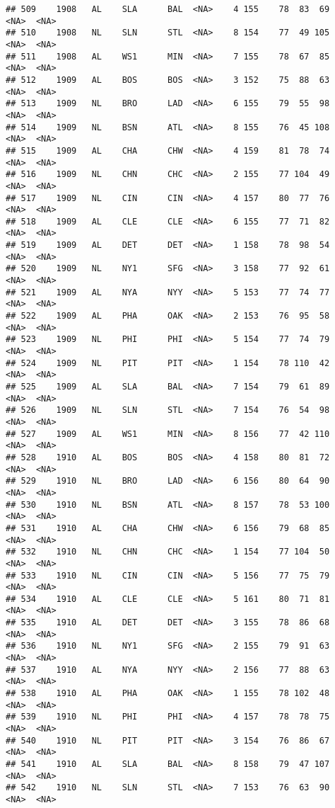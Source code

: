 \documentclass[]{article}
\begin{document}
\begin{verbatim}
## 509    1908   AL    SLA      BAL  <NA>    4 155    78  83  69   <NA>  <NA>
## 510    1908   NL    SLN      STL  <NA>    8 154    77  49 105   <NA>  <NA>
## 511    1908   AL    WS1      MIN  <NA>    7 155    78  67  85   <NA>  <NA>
## 512    1909   AL    BOS      BOS  <NA>    3 152    75  88  63   <NA>  <NA>
## 513    1909   NL    BRO      LAD  <NA>    6 155    79  55  98   <NA>  <NA>
## 514    1909   NL    BSN      ATL  <NA>    8 155    76  45 108   <NA>  <NA>
## 515    1909   AL    CHA      CHW  <NA>    4 159    81  78  74   <NA>  <NA>
## 516    1909   NL    CHN      CHC  <NA>    2 155    77 104  49   <NA>  <NA>
## 517    1909   NL    CIN      CIN  <NA>    4 157    80  77  76   <NA>  <NA>
## 518    1909   AL    CLE      CLE  <NA>    6 155    77  71  82   <NA>  <NA>
## 519    1909   AL    DET      DET  <NA>    1 158    78  98  54   <NA>  <NA>
## 520    1909   NL    NY1      SFG  <NA>    3 158    77  92  61   <NA>  <NA>
## 521    1909   AL    NYA      NYY  <NA>    5 153    77  74  77   <NA>  <NA>
## 522    1909   AL    PHA      OAK  <NA>    2 153    76  95  58   <NA>  <NA>
## 523    1909   NL    PHI      PHI  <NA>    5 154    77  74  79   <NA>  <NA>
## 524    1909   NL    PIT      PIT  <NA>    1 154    78 110  42   <NA>  <NA>
## 525    1909   AL    SLA      BAL  <NA>    7 154    79  61  89   <NA>  <NA>
## 526    1909   NL    SLN      STL  <NA>    7 154    76  54  98   <NA>  <NA>
## 527    1909   AL    WS1      MIN  <NA>    8 156    77  42 110   <NA>  <NA>
## 528    1910   AL    BOS      BOS  <NA>    4 158    80  81  72   <NA>  <NA>
## 529    1910   NL    BRO      LAD  <NA>    6 156    80  64  90   <NA>  <NA>
## 530    1910   NL    BSN      ATL  <NA>    8 157    78  53 100   <NA>  <NA>
## 531    1910   AL    CHA      CHW  <NA>    6 156    79  68  85   <NA>  <NA>
## 532    1910   NL    CHN      CHC  <NA>    1 154    77 104  50   <NA>  <NA>
## 533    1910   NL    CIN      CIN  <NA>    5 156    77  75  79   <NA>  <NA>
## 534    1910   AL    CLE      CLE  <NA>    5 161    80  71  81   <NA>  <NA>
## 535    1910   AL    DET      DET  <NA>    3 155    78  86  68   <NA>  <NA>
## 536    1910   NL    NY1      SFG  <NA>    2 155    79  91  63   <NA>  <NA>
## 537    1910   AL    NYA      NYY  <NA>    2 156    77  88  63   <NA>  <NA>
## 538    1910   AL    PHA      OAK  <NA>    1 155    78 102  48   <NA>  <NA>
## 539    1910   NL    PHI      PHI  <NA>    4 157    78  78  75   <NA>  <NA>
## 540    1910   NL    PIT      PIT  <NA>    3 154    76  86  67   <NA>  <NA>
## 541    1910   AL    SLA      BAL  <NA>    8 158    79  47 107   <NA>  <NA>
## 542    1910   NL    SLN      STL  <NA>    7 153    76  63  90   <NA>  <NA>

\end{verbatim}
\end{document}
